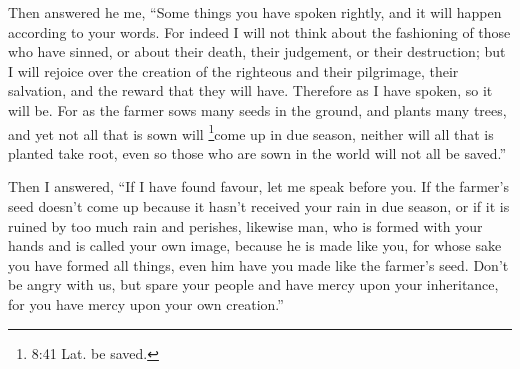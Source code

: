  Then answered he me, ``Some things you have spoken
rightly, and it will happen according to your words.  For
indeed I will not think about the fashioning of those who have sinned,
or about their death, their judgement, or their destruction;
 but I will rejoice over the creation of the righteous and
their pilgrimage, their salvation, and the reward that they will have.
 Therefore as I have spoken, so it will be. 
For as the farmer sows many seeds in the ground, and plants many trees,
and yet not all that is sown will \footnote{8:41 Lat. be saved.}come up
in due season, neither will all that is planted take root, even so those
who are sown in the world will not all be saved.''

 Then I answered, ``If I have found favour, let me speak
before you.  If the farmer's seed doesn't come up because
it hasn't received your rain in due season, or if it is ruined by too
much rain and perishes,  likewise man, who is formed with
your hands and is called your own image, because he is made like you,
for whose sake you have formed all things, even him have you made like
the farmer's seed.  Don't be angry with us, but spare your
people and have mercy upon your inheritance, for you have mercy upon
your own creation.''

